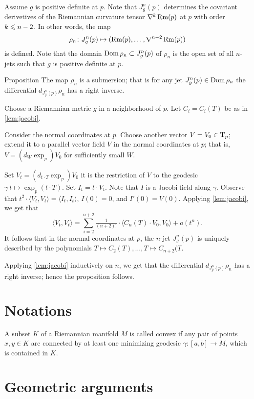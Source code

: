 \documentclass[a4paper,10pt]{article}
\begin{document}
Assume $g$ is positive definite at $p$.
Note that $J^n_g(p)$ determines the covariant derivetives of the Riemannian curvature tensor $\nabla^k\operatorname{Rm}(p)$ at $p$ with order $k\z\le n-2$.
In other words, the map 
\[\rho_n\colon J^n_g(p)\mapsto (\operatorname{Rm}(p),\dots,\nabla^{n-2}\operatorname{Rm}(p))\]
is defined.
Note that the domain $\mathop{\rm Dom}\nolimits \rho_n\subset J^n_g(p)$ of $\rho_n$ is the open set of all $n$-jets such that $g$ is positive definite at $p$.

\begin{thm}{Proposition}
The map $\rho_n$ is a submersion;
that is for any jet $J^n_g(p)\in \mathop{\rm Dom}\nolimits \rho_n$ the differential $d_{J^n_g(p)}\rho_n$ has a right inverse.
\end{thm}

Choose a Riemannian metric $g$ in a neighborhood of $p$.
Let $C_i=C_i(T)$ be as in \ref{lem:jacobi}.

Consider the normal coordinates at $p$.
Choose another vector $V=V_0\in \mathrm{T}_p$; extend it to a parallel vector field $V$ in the normal coordinates at $p$;
that is, $V=(d_W\exp_p)V_0$ for sufficiently small $W$.

Set $V_t=(d_{t\cdot T}\exp_p)V_0$ it is the restriction of $V$ to the geodesic $\gamma\:t\mapsto \exp_p(t\cdot T)$.
Set $I_t=t\cdot V_t$.
Note that $I$ is a Jacobi field along $\gamma$.
Observe that $t^2\cdot \langle V_t, V_t\rangle=\langle I_t, I_t\rangle$, $I(0)=0$, and $I'(0)=V(0)$.
Applying \ref{lem:jacobi}, we get that 
\[\langle V_t, V_t\rangle=\sum_{i=2}^{n+2}\tfrac1{(n+2)!}\cdot\langle C_n(T)\cdot V_0,V_0\rangle+o(t^n).\]
It follows that in the normal coordinates at $p$,
the $n$-jet $J^n_g(p)$ is uniquely described by the polynomials $T\mapsto C_2(T),\dots, T\mapsto C_{n+2}(T$.

Applying \ref{lem:jacobi} inductively on $n$, we get that the differential 
$d_{J^n_g(p)}\rho_n$ has a right inverse; hence the proposition follows.
\qeds 
 
\section{Notations}
 
A subset $K$ of a Riemannian manifold $M$ is called convex if  any pair of points $x,y \in K$
are connected by at least one minimizing geodesic $\gamma :[a,b]\to M$, which is  contained in $K$.


\section{Geometric arguments}
\end{document}
